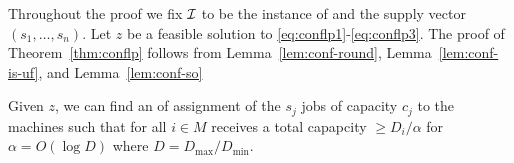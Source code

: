 \def\z{\bar z}
	    Throughout the proof we fix ${\cal I}$ to be the instance of \cckp and the supply vector $(s_1,\ldots,s_n)$. 
	    Let  $z$ be a feasible solution to \eqref{eq:conflp1}-\eqref{eq:conflp3}. The proof of Theorem~\ref{thm:conflp} follows from 
	    Lemma~\ref{lem:conf-round}, Lemma~\ref{lem:conf-is-uf}, and Lemma~\ref{lem:conf-so}
	    \begin{lemma}\label{lem:conf-round}
	    	Given $z$, we can  find an of assignment of the $s_j$ jobs of capacity $c_j$  to the machines such that for all $i\in M$
	    	receives a total capapcity $\geq D_i/\alpha$ for $\alpha = O(\log D)$ where $D = D_\mathrm{max}/D_\mathrm{min}$.
	    \end{lemma}
